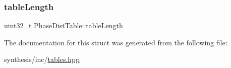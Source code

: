 \mbox{\label{struct_phase_dist_table_a1b871e67ce74c58645cd378ab683bc5d}} 
\subsubsection{\texorpdfstring{table\+Length}{tableLength}}
{\footnotesize\ttfamily uint32\+\_\+t Phase\+Dist\+Table\+::table\+Length}



The documentation for this struct was generated from the following file\+:\begin{DoxyCompactItemize}
\item 
synthesis/inc/\mbox{\hyperlink{tables_8hpp}{tables.\+hpp}}\end{DoxyCompactItemize}
